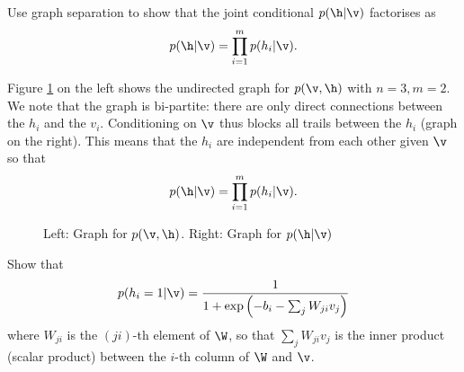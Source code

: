 \begin{exenumerate}
\item Use graph separation to show that the joint conditional $p(\h | \v)$ factorises as
  $$p(\h | \v) = \prod_{i=1}^m p(h_i | \v).$$

  \begin{solution}
    Figure \ref{fig:restricted-boltzmann-machine} on the left shows
    the undirected graph for $p(\v,\h)$ with $n=3, m=2$. We note that
    the graph is bi-partite: there are only direct connections
    between the $h_i$ and the $v_i$. Conditioning on $\v$ thus blocks
    all trails between the $h_i$ (graph on the right). This means that
    the $h_i$ are independent from each other given $\v$ so that
    $$p(\h | \v) = \prod_{i=1}^m p(h_i | \v).$$

    \begin{figure}[ht]
      \centering
      \caption{\label{fig:restricted-boltzmann-machine} Left: Graph for $p(\v,\h)$. Right: Graph for $p(\h | \v)$}
    \end{figure}
  \end{solution}

\item Show that
  \begin{equation}
    p(h_i = 1 | \v) = \frac{1}{1+\exp\left(-b_i-\sum_j W_{ji} v_j\right)}
    \label{eq:hcondv}
  \end{equation}
where $W_{ji}$ is the $(ji)$-th element of $\W$, so that $\sum_j W_{ji} v_j$ is the inner product (scalar product) between the $i$-th column of $\W$ and $\v$.
    \begin{solution}


\end{solution}
\end{exenumerate}
